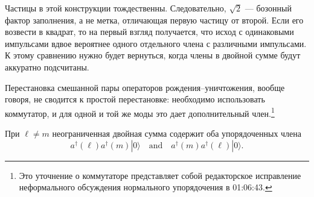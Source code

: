 Частицы в этой конструкции тождественны. Следовательно, \(\sqrt{2}\) — бозонный фактор заполнения, а не метка, отличающая первую частицу от второй. Если его возвести в квадрат, то на первый взгляд получается, что исход с одинаковыми импульсами вдвое вероятнее одного отдельного члена с различными импульсами. К этому сравнению нужно будет вернуться, когда члены в двойной сумме будут аккуратно подсчитаны.

\begin{classroomqa}
\end{classroomqa}

Перестановка смешанной пары операторов рождения--уничтожения, вообще говоря, не сводится к простой перестановке: необходимо использовать коммутатор, и для одной и той же моды это дает дополнительный член.\footnote{Это уточнение о коммутаторе представляет собой редакторское исправление неформального обсуждения нормального упорядочения в 01:06:43.}

\begin{classroomqa}
\end{classroomqa}

При \(\ell\ne m\) неограниченная двойная сумма содержит оба упорядоченных члена
\begin{equation}
a^\dagger(\ell)a^\dagger(m)|0\rangle
\quad\text{and}\quad
a^\dagger(m)a^\dagger(\ell)|0\rangle.
\end{equation}

\begin{classroomqa}
\end{classroomqa}

